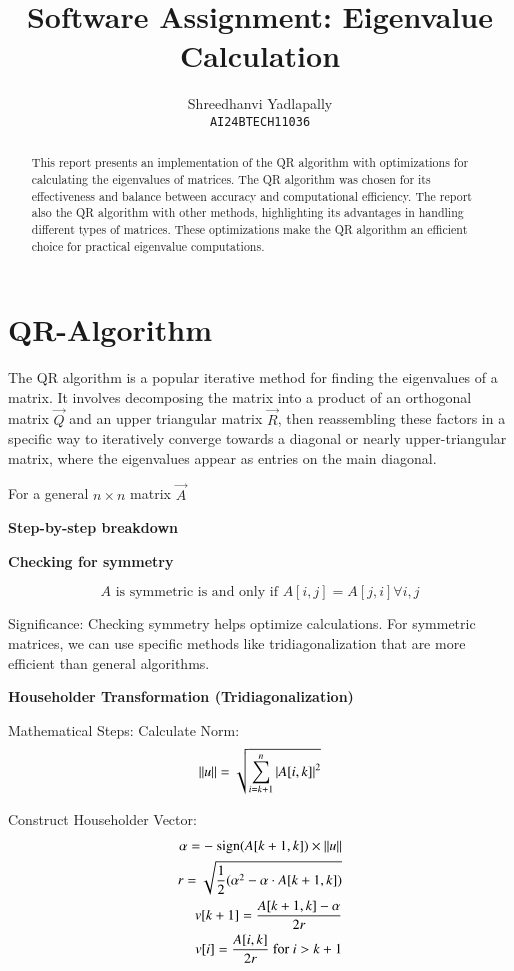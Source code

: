 \documentclass{article}
\title{Software Assignment: Eigenvalue Calculation}
\author{%
  Shreedhanvi Yadlapally\\%
  \texttt{AI24BTECH11036} \\
}
\theoremstyle{remark}
\begin{document}
\maketitle


\begin{abstract}
This report presents an implementation of the QR algorithm with optimizations for calculating the eigenvalues of matrices. The QR algorithm was chosen for its effectiveness and balance between accuracy and computational efficiency.  The report also the QR algorithm with other methods, highlighting its advantages in handling different types of matrices. These optimizations make the QR algorithm an efficient choice for practical eigenvalue computations.
\end{abstract}
\section{QR-Algorithm}

    The QR algorithm is a popular iterative method for finding the eigenvalues of a matrix. It involves decomposing the matrix into a product of an orthogonal matrix $\vec{Q}$ and an upper triangular matrix $\vec{R}$, then reassembling these factors in a specific way to iteratively converge towards a diagonal or nearly upper-triangular matrix, where the eigenvalues appear as entries on the main diagonal. 

    For a general $n \times n$ matrix $\vec{A}$
        
    \textbf{Step-by-step breakdown}
    
\textbf{Checking for symmetry}

        $$A \text{ is symmetric is and only if } A[i,j]=A[j,i] \forall i,j$$

    Significance: Checking symmetry helps optimize calculations. For symmetric matrices, we can use specific methods like tridiagonalization that are more efficient than general algorithms.

\textbf{Householder Transformation (Tridiagonalization)}

    Mathematical Steps: 
    Calculate Norm:
        $$\left\lVert u\right\rVert=\sqrt{\sum_{i=k+1}^n \left\vert A[i,k]\right\vert^{2}}$$

    Construct Householder Vector:
        \begin{align*}
            \alpha = -\text{ sign}(A[k+1,k])\times \left\lVert u\right\rVert \\
            r =\sqrt{\frac{1}{2}(\alpha^2 -\alpha \cdot A[k+1,k])} \\
            v[k+1]=\frac{A[k+1,k]-\alpha}{2r} \\
            v[i]=\frac{A[i,k]}{2r} \text{ for } i>k+1
        \end{align*}
\end{document}
